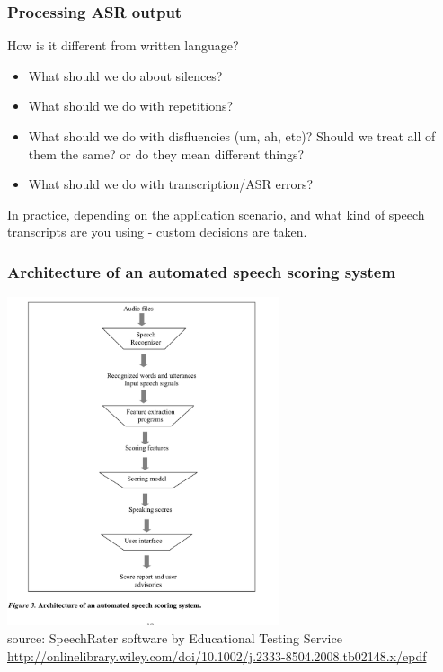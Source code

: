 \documentclass{beamer}
\begin{document}
\begin{frame}
\frametitle{Processing ASR output}
How is it different from written language?
\begin{itemize}
\item What should we do about silences?
\item  What should we do with repetitions?
\item What should we do with disfluencies (um, ah, etc)? Should we treat all of them the same? or do they mean different things?
\item What should we do with transcription/ASR errors?
\end{itemize}
\medskip In practice, depending on the application scenario, and what kind of speech transcripts are you using - custom decisions are taken. 
\end{frame}

\begin{frame}
\frametitle{Architecture of an automated speech scoring system}
\includegraphics[width=0.6\textwidth]{scoringarch.png}
 \\ \footnotesize source: SpeechRater software by Educational Testing Service
 \\ \url{http://onlinelibrary.wiley.com/doi/10.1002/j.2333-8504.2008.tb02148.x/epdf}
\end{frame}
\end{document}
